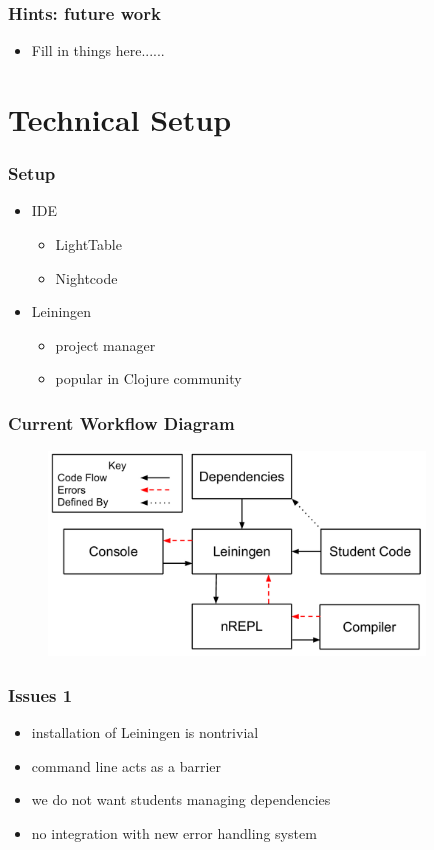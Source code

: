 \documentclass{beamer}
\begin{document}
\begin{frame}
\frametitle{Hints: future work}
	\begin{itemize}
  	 \item Fill in things here......
	 \end{itemize}
\end{frame}
\section{Technical Setup}
\begin{frame}
\frametitle{Setup}
	\begin{itemize}
		\item IDE
		\begin{itemize}
			\item LightTable
			\item Nightcode
		\end{itemize}
		\item Leiningen
		\begin{itemize}
			\item project manager
			\item popular in Clojure community
		\end{itemize}
	\end{itemize}
\end{frame}

\begin{frame}[fragile]
\frametitle{Current Workflow Diagram}
\begin{figure}[h]
 \includegraphics[width=10cm]{../CurrentErrorHandling.pdf}
 \centering
\end{figure}
\end{frame}

\begin{frame}
\frametitle{Issues 1}
	\begin{itemize}
		\item installation of Leiningen is nontrivial
		\item command line acts as a barrier
		\item we do not want students managing dependencies
		\item no integration with new error handling system
	\end{itemize} 
\end{frame}
\end{document}
